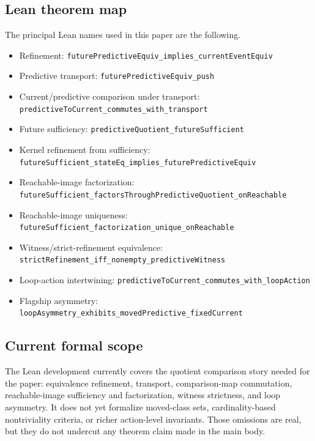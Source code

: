 \documentclass[11pt]{article}
\theoremstyle{definition}
\begin{document}
\subsection{Lean theorem map}\label{appsubsec:lean-theorem-map}
The principal Lean names used in this paper are the following.
\begin{itemize}[leftmargin=*]\small
\item Refinement:
\nolinkurl{futurePredictiveEquiv_implies_currentEventEquiv}

\item Predictive transport:
\nolinkurl{futurePredictiveEquiv_push}

\item Current/predictive comparison under transport:
\nolinkurl{predictiveToCurrent_commutes_with_transport}

\item Future sufficiency:
\nolinkurl{predictiveQuotient_futureSufficient}

\item Kernel refinement from sufficiency:
\nolinkurl{futureSufficient_stateEq_implies_futurePredictiveEquiv}

\item Reachable-image factorization:
\nolinkurl{futureSufficient_factorsThroughPredictiveQuotient_onReachable}

\item Reachable-image uniqueness:
\nolinkurl{futureSufficient_factorization_unique_onReachable}

\item Witness/strict-refinement equivalence:
\nolinkurl{strictRefinement_iff_nonempty_predictiveWitness}

\item Loop-action intertwining:
\nolinkurl{predictiveToCurrent_commutes_with_loopAction}

\item Flagship asymmetry:
\nolinkurl{loopAsymmetry_exhibits_movedPredictive_fixedCurrent}
\end{itemize}

\subsection{Current formal scope}\label{appsubsec:lean-scope}
The Lean development currently covers the quotient comparison story needed for the paper: equivalence refinement, transport, comparison-map commutation, reachable-image sufficiency and factorization, witness strictness, and loop asymmetry. It does not yet formalize moved-class sets, cardinality-based nontriviality criteria, or richer action-level invariants. Those omissions are real, but they do not undercut any theorem claim made in the main body.
\end{document}
